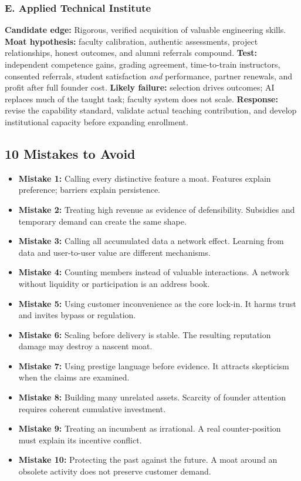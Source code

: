 \subsubsection{E. Applied Technical Institute}
\textbf{Candidate edge:} Rigorous, verified acquisition of valuable engineering skills. \textbf{Moat hypothesis:} faculty calibration, authentic assessments, project relationships, honest outcomes, and alumni referrals compound. \textbf{Test:} independent competence gains, grading agreement, time-to-train instructors, consented referrals, student satisfaction \textit{and} performance, partner renewals, and profit after full founder cost. \textbf{Likely failure:} selection drives outcomes; AI replaces much of the taught task; faculty system does not scale. \textbf{Response:} revise the capability standard, validate actual teaching contribution, and develop institutional capacity before expanding enrollment.

\subsection{10 Mistakes to Avoid}
\label{sec:ten_mistakes_to_avoid}

\begin{itemize}
    \item \textbf{Mistake 1:} Calling every distinctive feature a moat. Features explain preference; barriers explain persistence.
    \item \textbf{Mistake 2:} Treating high revenue as evidence of defensibility. Subsidies and temporary demand can create the same shape.
    \item \textbf{Mistake 3:} Calling all accumulated data a network effect. Learning from data and user-to-user value are different mechanisms.
    \item \textbf{Mistake 4:} Counting members instead of valuable interactions. A network without liquidity or participation is an address book.
    \item \textbf{Mistake 5:} Using customer inconvenience as the core lock-in. It harms trust and invites bypass or regulation.
    \item \textbf{Mistake 6:} Scaling before delivery is stable. The resulting reputation damage may destroy a nascent moat.
    \item \textbf{Mistake 7:} Using prestige language before evidence. It attracts skepticism when the claims are examined.
    \item \textbf{Mistake 8:} Building many unrelated assets. Scarcity of founder attention requires coherent cumulative investment.
    \item \textbf{Mistake 9:} Treating an incumbent as irrational. A real counter-position must explain its incentive conflict.
    \item \textbf{Mistake 10:} Protecting the past against the future. A moat around an obsolete activity does not preserve customer demand.
\end{itemize}


